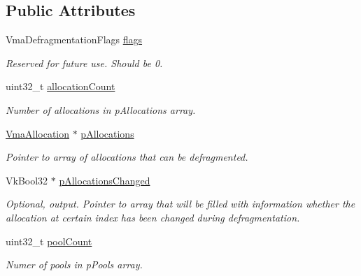 \subsection*{Public Attributes}
\begin{DoxyCompactItemize}
\item 
\mbox{\label{structVmaDefragmentationInfo2_a53e844ee5633e229cf6daf14b2d9fff9}} 
Vma\+Defragmentation\+Flags \hyperlink{structVmaDefragmentationInfo2_a53e844ee5633e229cf6daf14b2d9fff9}{flags}
\begin{DoxyCompactList}\small\item\em Reserved for future use. Should be 0. \end{DoxyCompactList}\item 
\mbox{\label{structVmaDefragmentationInfo2_a3cf86ab32c1da779b4923d301a3056ba}} 
uint32\+\_\+t \hyperlink{structVmaDefragmentationInfo2_a3cf86ab32c1da779b4923d301a3056ba}{allocation\+Count}
\begin{DoxyCompactList}\small\item\em Number of allocations in {\ttfamily p\+Allocations} array. \end{DoxyCompactList}\item 
\hyperlink{structVmaAllocation}{Vma\+Allocation} $\ast$ \hyperlink{structVmaDefragmentationInfo2_a8943f8d65969ce8e2189a1cdf3205e96}{p\+Allocations}
\begin{DoxyCompactList}\small\item\em Pointer to array of allocations that can be defragmented. \end{DoxyCompactList}\item 
Vk\+Bool32 $\ast$ \hyperlink{structVmaDefragmentationInfo2_a76d51a644dc7f5405d0cdd0025ecd0cc}{p\+Allocations\+Changed}
\begin{DoxyCompactList}\small\item\em Optional, output. Pointer to array that will be filled with information whether the allocation at certain index has been changed during defragmentation. \end{DoxyCompactList}\item 
\mbox{\label{structVmaDefragmentationInfo2_a7e70aa2a1081d849dcc7829b19d3ec9d}} 
uint32\+\_\+t \hyperlink{structVmaDefragmentationInfo2_a7e70aa2a1081d849dcc7829b19d3ec9d}{pool\+Count}
\begin{DoxyCompactList}\small\item\em Numer of pools in {\ttfamily p\+Pools} array. \end{DoxyCompactList}\item 

\end{DoxyCompactItemize}
